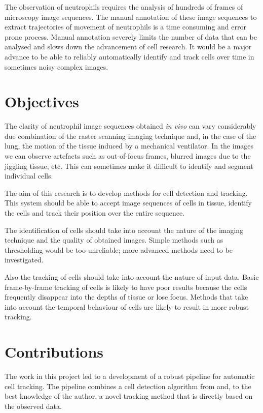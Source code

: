 		The observation of neutrophils requires the analysis of hundreds of frames of microscopy image sequences. The manual annotation of these image sequences to extract trajectories of movement of neutrophils is a time consuming and error prone process. Manual annotation severely limits the number of data that can be analysed and slows down the advancement of cell research. It would be a major advance to be able to reliably automatically identify and track cells over time in sometimes noisy complex images.
		
	\section{Objectives \statusfirstdraft}
		
		The clarity of neutrophil image sequences obtained \textit{in vivo} can vary considerably due combination of the raster scanning imaging technique and, in the case of the lung, the motion of the tissue induced by a mechanical ventilator. In the images we can observe artefacts such as out-of-focus frames, blurred images due to the jiggling tissue, etc. This can sometimes make it difficult to identify and segment individual cells.
		
		The aim of this research is to develop methods for cell detection and tracking. This system should be able to accept image sequences of cells in tissue, identify the cells and track their position over the entire sequence.
		
		The identification of cells should take into account the nature of the imaging technique and the quality of obtained images. Simple methods such as thresholding would be too unreliable; more advanced methods need to be investigated.
		
		Also the tracking of cells should take into account the nature of input data. Basic frame-by-frame tracking of cells is likely to have poor results because the cells frequently disappear into the depths of tissue or lose focus. Methods that take into account the temporal behaviour of cells are likely to result in more robust tracking.
		
	\section{Contributions \statusfirstdraft}
		
		The work in this project led to a development of a robust pipeline for automatic cell tracking. The pipeline combines a cell detection algorithm from \cite{arteta12} and, to the best knowledge of the author, a novel tracking method that is directly based on the observed data. 
		
